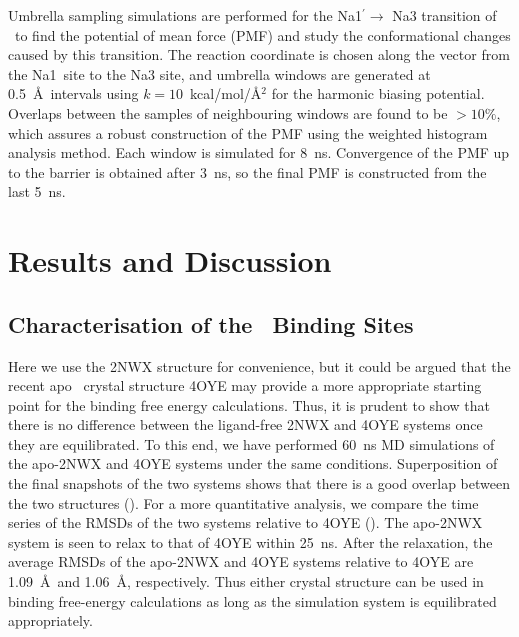 Umbrella sampling simulations are performed for the Na1$^\prime\rightarrow$ Na3 transition of \Na\ 
to find the potential of mean force (PMF) and study the conformational changes caused by this transition.
The reaction coordinate is chosen along the vector from the Na1\prim\ site to the Na3 site, and umbrella 
windows are generated at 0.5~\AA\ intervals using $k=10$~kcal/mol/\AA$^2$ for the harmonic biasing potential. 
Overlaps between the samples of neighbouring windows are found to be $>10\%$, which assures a robust 
construction of the PMF using the weighted histogram analysis method. Each window is simulated for 8~ns.
Convergence of the PMF up to the barrier is obtained after 3~ns, so the final PMF is constructed from the 
last 5~ns.

\section{Results and Discussion}
\subsection{Characterisation of the \Na\ Binding Sites}
Here we use the 2NWX structure for convenience, but it could be argued that the recent apo \GltPh\ 
crystal structure 4OYE \cite{Verdon2014} may provide a more appropriate starting point for the 
binding free energy calculations. Thus, it is prudent to show that there is no difference between 
the ligand-free 2NWX and 4OYE systems once they are equilibrated. To this end, we have performed 
60~ns MD simulations of the apo-2NWX and 4OYE systems under the same conditions. Superposition of 
the final snapshots of the two systems shows that there is a good overlap between the two structures 
(\figrefn{bind:figS3}{A}). For a more quantitative analysis, we compare the time series of the RMSDs 
of the two systems relative to 4OYE (\figrefn{bind:figS3}{B}). The apo-2NWX system is seen to relax 
to that of 4OYE within 25~ns. After the relaxation, the average RMSDs of the apo-2NWX and 4OYE systems 
relative to 4OYE are 1.09~\AA\ and 1.06~\AA, respectively. Thus either crystal structure can be used 
in binding free-energy calculations as long as the simulation system is equilibrated appropriately.

